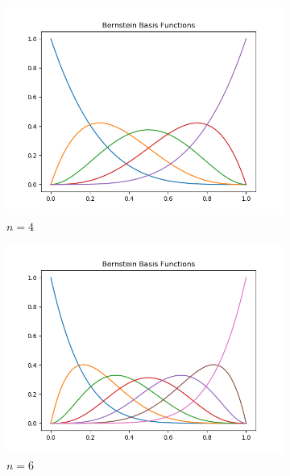 \documentclass[12pt,letterpaper]{article}
\begin{document}
\begin{figure}[H]
    \begin{center}
        \caption{Bernstein basis function graphs (Listing \ref{lst:bern})}
        \begin{subfigure}[b]{.3\linewidth}
            \includegraphics[width=\linewidth]{bern5}
            \caption{$n=4$}
        \end{subfigure}
        \begin{subfigure}[b]{.3\linewidth}
            \includegraphics[width=\linewidth]{bern7}
            \caption{$n=6$}
        \end{subfigure}
        \begin{subfigure}[b]{.3\linewidth}

\end{subfigure}
\end{center}
\end{figure}
\end{document}
